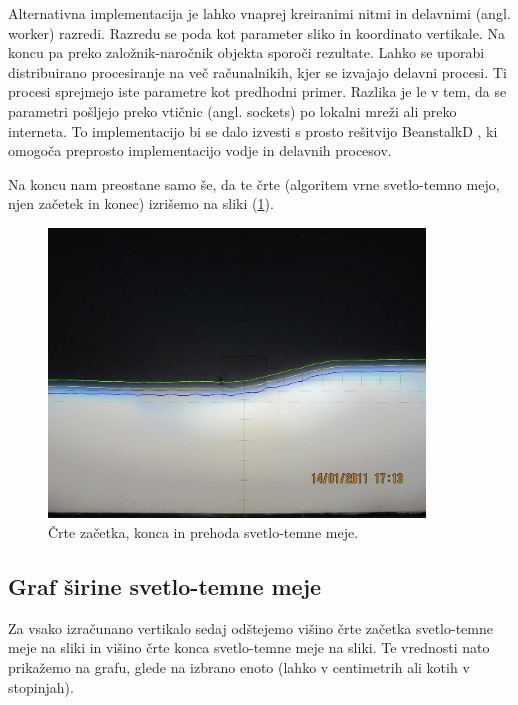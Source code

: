 \documentclass[oneside, a4paper, 12pt]{book}
\begin{document}
Alternativna implementacija je lahko vnaprej kreiranimi nitmi in delavnimi (angl. worker) razredi. Razredu se poda kot parameter sliko in koordinato vertikale. Na koncu pa preko založnik-naročnik objekta sporoči rezultate. Lahko se uporabi distribuirano procesiranje na več računalnikih, kjer se izvajajo delavni procesi. Ti procesi sprejmejo iste parametre kot predhodni primer. Razlika je le v tem, da se parametri pošljejo preko vtičnic (angl. sockets) po lokalni mreži ali preko interneta. To implementacijo bi se dalo izvesti s prosto rešitvijo BeanstalkD \cite{beanstalkd}, ki omogoča preprosto implementacijo vodje in delavnih procesov.

Na koncu nam preostane samo še, da te črte (algoritem vrne svetlo-temno mejo, njen začetek in konec) izrišemo na sliki (\ref{pic:svet-tem3}). 



\begin{figure}
\begin{center}
\includegraphics[width=10cm]{slike/svetlo-temna-meja-po-celi-sirini.jpg}
\end{center}
\caption{Črte začetka, konca in prehoda svetlo-temne meje.}
\label{pic:svet-tem3}
\end{figure}

\subsection{Graf širine svetlo-temne meje}
Za vsako izračunano vertikalo sedaj odštejemo višino črte začetka svetlo-temne meje na sliki in višino črte konca svetlo-temne meje na sliki. Te vrednosti nato prikažemo na grafu, glede na izbrano enoto (lahko v centimetrih ali kotih v stopinjah).
\end{document}
